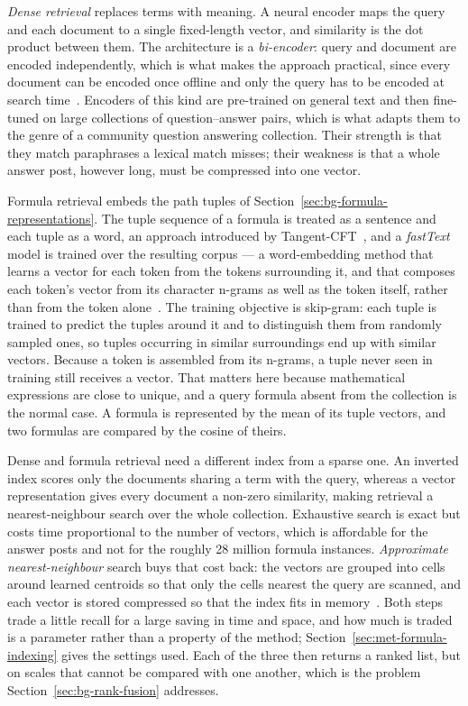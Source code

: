 \emph{Dense retrieval} replaces terms with meaning. A neural encoder maps the
query and each document to a single fixed-length vector, and similarity is the dot
product between them. The architecture is a \emph{bi-encoder}: query and document
are encoded independently, which is what makes the approach practical, since every
document can be encoded once offline and only the query has to be encoded at
search time~\cite{karpukhin2020dpr}. Encoders of this kind are
pre-trained on general text and then fine-tuned on large collections of
question--answer pairs, which is what adapts them to the genre of a community
question answering collection. Their strength is that they match paraphrases a
lexical match misses; their weakness is that a whole answer post, however long,
must be compressed into one vector.

Formula retrieval embeds the path tuples of
Section~\ref{sec:bg-formula-representations}. The tuple sequence of a formula is
treated as a sentence and each tuple as a word, an approach introduced by
Tangent-CFT~\cite{mansouri2019tangentcft}, and a \emph{fastText} model is trained
over the resulting corpus --- a word-embedding method that learns a vector for
each token from the tokens surrounding it, and that composes each token's vector
from its character n-grams as well as the token itself, rather than from the token
alone~\cite{bojanowski2017fasttext}. The training objective is skip-gram: each
tuple is trained to predict the tuples around it and to distinguish them from
randomly sampled ones, so tuples occurring in similar surroundings end up with
similar vectors. Because a token is assembled from its n-grams, a tuple never seen
in training still receives a vector. That matters here because mathematical
expressions are close to unique, and a query formula absent from the collection is
the normal case. A formula is represented by the mean of its tuple vectors, and
two formulas are compared by the cosine of theirs.

Dense and formula retrieval need a different index from a sparse one. An inverted
index scores only the documents sharing a term with the query, whereas a vector
representation gives every document a non-zero similarity, making retrieval a
nearest-neighbour search over the whole collection. Exhaustive search is exact but
costs time proportional to the number of vectors, which is affordable for the
answer posts and not for the roughly 28 million formula instances. \emph{Approximate
nearest-neighbour} search buys that cost back: the vectors are grouped into cells
around learned centroids so that only the cells nearest the query are scanned, and
each vector is stored compressed so that the index fits in
memory~\cite{johnson2021faiss}. Both steps trade a little recall for a large
saving in time and space, and how much is traded is a parameter rather than a
property of the method; Section~\ref{sec:met-formula-indexing} gives the settings
used. Each of the three then returns a ranked list, but on scales that cannot be
compared with one another, which is the problem Section~\ref{sec:bg-rank-fusion}
addresses.


